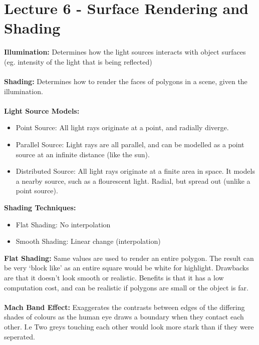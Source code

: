 \documentclass[a4paper,10pt]{article}
\begin{document}
\section*{Lecture 6 - Surface Rendering and Shading}
\textcolor{WildStrawberry}{\textbf{Illumination:}} Determines how the light sources interacts with object surfaces (eg. intensity of the light that is being reflected) \\ \\
\textcolor{WildStrawberry}{\textbf{Shading:}} Determines how to render the faces of polygons in a scene, given the illumination. \\ \\
\textcolor{WildStrawberry}{\textbf{Light Source Models:}}
\renewcommand{\labelitemi}{\textperiodcentered}
\begin{itemize}
\item \textcolor{WildStrawberry}{Point Source:} All light rays originate at a point, and radially diverge. 
\item \textcolor{WildStrawberry}{Parallel Source:} Light rays are all parallel, and can be modelled as a point source at an infinite distance (like the sun). 
\item \textcolor{WildStrawberry}{Distributed Source:} All light rays originate at a finite area in space. It models a nearby source, such as a flourescent light. Radial, but spread out (unlike a point source).
\end{itemize}
\newpage
\noindent \textcolor{WildStrawberry}{\textbf{Shading Techniques:}}
\renewcommand{\labelitemi}{\textperiodcentered}
\begin{itemize}
\item \textcolor{WildStrawberry}{Flat Shading:} No interpolation
\item \textcolor{WildStrawberry}{Smooth Shading:} Linear change (interpolation) 
\end{itemize}
\textcolor{WildStrawberry}{\textbf{Flat Shading:}} Same values are used to render an entire polygon. The result can be very `block like' as an entire square would be white for highlight. Drawbacks are that it doesn't look smooth or realistic. Benefits is that it has a low computation cost, and can be realistic if polygons are small or the object is far. \\ \\
\textcolor{WildStrawberry}{\textbf{Mach Band Effect:}} Exaggerates the contrasts between edges of the differing shades of colours as the human eye draws a boundary when they contact each other. I.e Two greys touching each other would look more stark than if they were seperated. \\ \\
\end{document}

